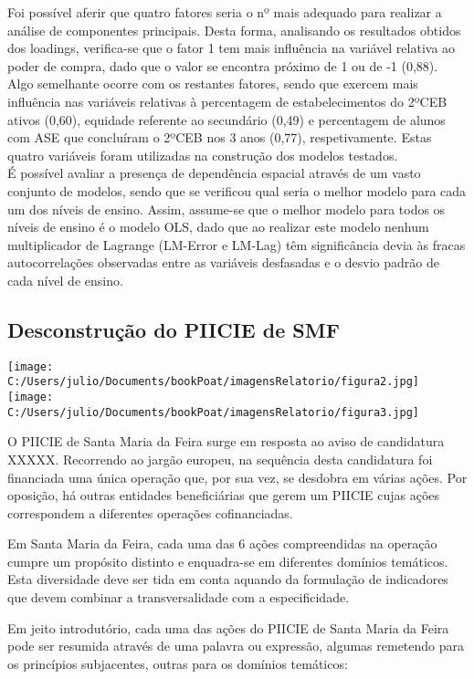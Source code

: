 \documentclass[
]{book}
\begin{document}
Foi possível aferir que quatro fatores seria o nº mais adequado para realizar a análise de componentes principais. Desta forma, analisando os resultados obtidos dos loadings, verifica-se que o fator 1 tem mais influência na variável relativa ao poder de compra, dado que o valor se encontra próximo de 1 ou de -1 (0,88). Algo semelhante ocorre com os restantes fatores, sendo que exercem mais influência nas variáveis relativas à percentagem de estabelecimentos do 2ºCEB ativos (0,60), equidade referente ao secundário (0,49) e percentagem de alunos com ASE que concluíram o 2ºCEB nos 3 anos (0,77), respetivamente. Estas quatro variáveis foram utilizadas na construção dos modelos testados.\\
É possível avaliar a presença de dependência espacial através de um vasto conjunto de modelos, sendo que se verificou qual seria o melhor modelo para cada um dos níveis de ensino. Assim, assume-se que o melhor modelo para todos os níveis de ensino é o modelo OLS, dado que ao realizar este modelo nenhum multiplicador de Lagrange (LM-Error e LM-Lag) têm significância devia às fracas autocorrelações observadas entre as variáveis desfasadas e o desvio padrão de cada nível de ensino.

\hypertarget{desconstruuxe7uxe3o-do-piicie-de-smf}{%
\subsection{Desconstrução do PIICIE de SMF}\label{desconstruuxe7uxe3o-do-piicie-de-smf}}

\texttt{[image: C:/Users/julio/Documents/bookPoat/imagensRelatorio/figura2.jpg]}\\
\texttt{[image: C:/Users/julio/Documents/bookPoat/imagensRelatorio/figura3.jpg]}

O PIICIE de Santa Maria da Feira surge em resposta ao aviso de candidatura XXXXX. Recorrendo ao jargão europeu, na sequência desta candidatura foi financiada uma única operação que, por sua vez, se desdobra em várias ações. Por oposição, há outras entidades beneficiárias que gerem um PIICIE cujas ações correspondem a diferentes operações cofinanciadas.

Em Santa Maria da Feira, cada uma das 6 ações compreendidas na operação cumpre um propósito distinto e enquadra-se em diferentes domínios temáticos. Esta diversidade deve ser tida em conta aquando da formulação de indicadores que devem combinar a transversalidade com a especificidade.

Em jeito introdutório, cada uma das ações do PIICIE de Santa Maria da Feira pode ser resumida através de uma palavra ou expressão, algumas remetendo para os princípios subjacentes, outras para os domínios temáticos:
\end{document}
